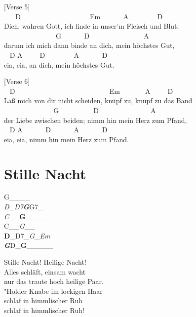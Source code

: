 \documentclass[
  letterpaper,
]{scrbook}
\begin{document}
{[}Verse 5{]}\\
\hspace*{0.333em} ~ ~ D ~ ~ ~ ~ ~ ~ ~ ~ ~ ~ ~ ~Em ~ ~ ~ ~A ~ ~ ~ ~ ~D\\
Dich, wahren Gott, ich finde in unser'm Fleisch und Blut;\\
\hspace*{0.333em} ~ ~ ~ ~ ~ ~ ~ ~ ~ G ~ ~ ~ ~D ~ ~ ~ ~ ~ ~ ~ ~ ~ A\\
darum ich mich dann binde an dich, mein höchstes Gut,\\
\hspace*{0.333em} ~ D A ~ ~ ~D ~ ~ ~ ~ ~A ~ ~ ~ ~D\\
eia, eia, an dich, mein höchstes Gut.

{[}Verse 6{]}\\
\hspace*{0.333em} ~ D ~ ~ ~ ~ ~ ~ ~ ~ ~ ~ ~ ~ ~ ~ ~ ~ Em ~ ~ ~ ~ A ~ ~
~D\\
Laß mich von dir nicht scheiden, knüpf zu, knüpf zu das Band\\
\hspace*{0.333em} ~ ~ ~ ~ ~ ~ ~ ~ ~G ~ ~ ~ ~ ~ ~D ~ ~ ~ ~ ~ ~ ~ ~ ~A\\
der Liebe zwischen beiden; nimm hin mein Herz zum Pfand,\\
\hspace*{0.333em} ~ D A ~ ~ ~ ~D ~ ~ ~ ~A ~ ~ ~ ~D\\
eia, eia, nimm hin mein Herz zum Pfand.

\hypertarget{stille-nacht}{%
\chapter{Stille Nacht}\label{stille-nacht}}

G\_\textbf{\textbar{}}\_\emph{\textbar{}}\_\textbf{\textbar{}}\_\emph{\textbar{}\\
D}\_\emph{\textbar D7\textbf{\textbar G}}\textbar G7\_\emph{\textbar{}\\
C}\_\emph{\textbar{}}\_\textbf{\textbar G}\_\textbar\_\_\_\_\textbar{}\\
C\_\textbf{\textbar{}}\_\emph{\textbar G}\_\emph{\textbar{}}\_\textbf{\textbar{}\\
D}\_\textbar D7\_\emph{\textbar G}\_\emph{\textbar Em\textbf{\textbar{}\\
G}}\textbar D\_\textbf{\textbar G}\_\textbar\_\_\_\_\textbar{}

Stille Nacht! Heilige Nacht!\\
Alles schläft, einsam wacht\\
nur das traute hoch heilige Paar.\\
"Holder Knabe im lockigen Haar\\
schlaf in himmlischer Ruh\textquotesingle{}\\
schlaf in himmlischer Ruh\textquotesingle!
\end{document}
